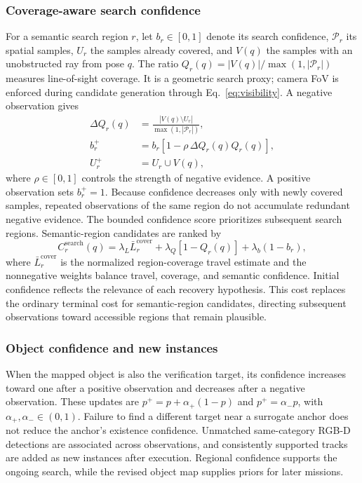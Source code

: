 \documentclass[letterpaper,10pt,journal]{IEEEtran}
\begin{document}
\subsubsection{Coverage-aware search confidence}
For a semantic search region $r$, let $b_r\in[0,1]$ denote its search confidence, $\mathcal P_r$ its spatial samples, $U_r$ the samples already covered, and $V(q)$ the samples with an unobstructed ray from pose $q$. The ratio $Q_r(q)=|V(q)|/\max(1,|\mathcal P_r|)$ measures line-of-sight coverage. It is a geometric search proxy; camera FoV is enforced during candidate generation through Eq.~\ref{eq:visibility}. A negative observation gives
\begin{equation}
\begin{aligned}
\Delta Q_r(q)&=\frac{|V(q)\setminus U_r|}{\max(1,|\mathcal P_r|)},\\
b_r^+&=b_r[1-\rho\,\Delta Q_r(q)Q_r(q)],\\
U_r^+&=U_r\cup V(q),
\end{aligned}
\label{eq:belief}
\end{equation}
where $\rho\in[0,1]$ controls the strength of negative evidence. A positive observation sets $b_r^+=1$. Because confidence decreases only with newly covered samples, repeated observations of the same region do not accumulate redundant negative evidence. The bounded confidence score prioritizes subsequent search regions. Semantic-region candidates are ranked by
\begin{equation}
C_r^{\mathrm{search}}(q)=\lambda_L\bar L_r^{\mathrm{cover}}+\lambda_Q[1-Q_r(q)]+\lambda_b(1-b_r),
\label{eq:search-cost}
\end{equation}
where $\bar L_r^{\mathrm{cover}}$ is the normalized region-coverage travel estimate and the nonnegative weights balance travel, coverage, and semantic confidence. Initial confidence reflects the relevance of each recovery hypothesis. This cost replaces the ordinary terminal cost for semantic-region candidates, directing subsequent observations toward accessible regions that remain plausible.

\subsubsection{Object confidence and new instances}
When the mapped object is also the verification target, its confidence increases toward one after a positive observation and decreases after a negative observation. These updates are $p^+=p+\alpha_+(1-p)$ and $p^+=\alpha_-p$, with $\alpha_+,\alpha_-\in(0,1)$. Failure to find a different target near a surrogate anchor does not reduce the anchor's existence confidence. Unmatched same-category RGB-D detections are associated across observations, and consistently supported tracks are added as new instances after execution. Regional confidence supports the ongoing search, while the revised object map supplies priors for later missions.
\end{document}
